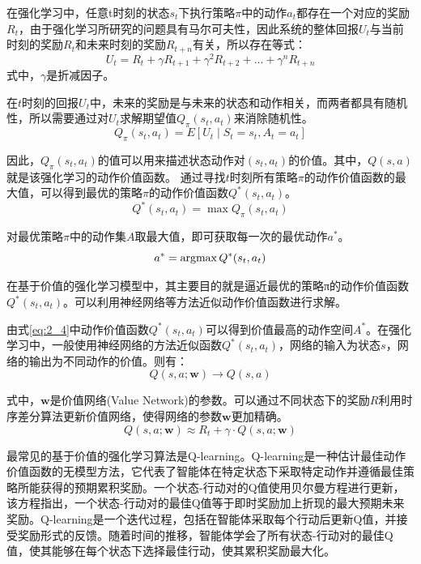 在强化学习中，任意t时刻的状态$s_t$下执行策略$\pi$中的动作$a_t$都存在一个对应的奖励$R_t$，由于强化学习所研究的问题具有马尔可夫性，因此系统的整体回报$U_t$与当前时刻的奖励$R_t$和未来时刻的奖励$R_{t+n}$有关，所以存在等式：
\begin{equation}
  \label{eq:2_1}
  U_t = R_t + \gamma R_{t+1} + \gamma^2 R_{t+2} + ... + \gamma^n R_{t+n}
\end{equation}
式中，$\gamma$是折减因子。

在$t$时刻的回报$U_t$中，未来的奖励是与未来的状态和动作相关，而两者都具有随机性，所以需要通过对$U_t$求解期望值$Q_π (s_t,a_t)$来消除随机性\cite{XTYY202012003}。
\begin{equation}
  \label{eq:2_2}
  Q_π (s_t,a_t) = E[U_t\mid S_t=s_t, A_t = a_t]
\end{equation}

因此，$Q_π (s_t,a_t)$的值可以用来描述状态动作对$(s_t,a_t )$的价值。其中，$Q(s,a)$就是该强化学习的动作价值函数。
通过寻找$t$时刻所有策略$\pi$的动作价值函数的最大值，可以得到最优的策略$\pi$的动作价值函数$Q^* (s_t,a_t )$。
\begin{equation}
  \label{eq:2_3}
  Q^* (s_t,a_t) = \max Q_π (s_t,a_t)
\end{equation}

对最优策略$\pi$中的动作集$A$取最大值，即可获取每一次的最优动作$a^*$。
\begin{equation}
  \label{eq:2_4}
  a^* = \operatorname*{argmax} Q^* (s_t,a_t)
\end{equation}

在基于价值的强化学习模型中，其主要目的就是逼近最优的策略π的动作价值函数$Q^* (s_t,a_t )$。可以利用神经网络等方法近似动作价值函数进行求解。

由式\ref{eq:2_4}中动作价值函数$Q^* (s_t,a_t )$可以得到价值最高的动作空间$A^*$。在强化学习中，一般使用神经网络的方法近似函数$Q^* (s_t,a_t )$，网络的输入为状态$s$，网络的输出为不同动作的价值。则有：
\begin{equation}
  \label{eq:2_5}
  Q(s,a;\mathbf{w}) \rightarrow Q(s,a)
\end{equation}

	式中，$\mathbf{w}$是价值网络(Value Network)的参数。可以通过不同状态下的奖励$R$利用时序差分算法更新价值网络，使得网络的参数$\mathbf{w}$更加精确。
\begin{equation}
  \label{eq:2_6}
  Q(s,a;\mathbf{w}) \approx R_t + \gamma \cdot Q(s,a;\mathbf{w})
\end{equation}

最常见的基于价值的强化学习算法是Q-learning。Q-learning是一种估计最佳动作价值函数的无模型方法，它代表了智能体在特定状态下采取特定动作并遵循最佳策略所能获得的预期累积奖励。一个状态-行动对的Q值使用贝尔曼方程进行更新，该方程指出，一个状态-行动对的最佳Q值等于即时奖励加上折现的最大预期未来奖励。Q-learning是一个迭代过程，包括在智能体采取每个行动后更新Q值，并接受奖励形式的反馈。随着时间的推移，智能体学会了所有状态-行动对的最佳Q值，使其能够在每个状态下选择最佳行动，使其累积奖励最大化。


